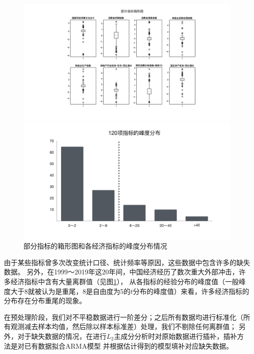 \begin{figure}[H]
    \flushleft
    \begin{minipage}[t]{1\textwidth}
    \includegraphics[width=16cm]{pics/chapter2/box.pdf}
    \end{minipage}
    \begin{minipage}[t]{1\textwidth}
    \centering
    \includegraphics[width=12cm]{pics/chapter2/skew.pdf}
    \end{minipage}
    \caption{\small 部分指标的箱形图和各经济指标的峰度分布情况}
    \label{desc}
\end{figure}

由于某些指标曾多次改变统计口径、统计频率等原因，这些数据中包含许多的缺失数据。
另外，在1999～2019年这20年间，中国经济经历了数次重大外部冲击，许多经济指标中含有大量离群值（见图\ref{desc}），
从各指标的经验分布的峰度值（一般峰度大于8就被认为是重尾，8是自由度为5的$t$分布的峰度值）来看，许多经济指标的分布存在分布重尾的现象。

在预处理阶段，我们对不平稳数据进行一阶差分；之后所有数据均进行标准化（所有观测减去样本均值，然后除以样本标准差）处理，我们不剔除任何离群值；
另外，对于缺失数据的情况，在进行$L_2$主成分分析时对原始数据进行插补，插补方法是对已有数据拟合ARMA模型
并根据估计得到的模型填补对应缺失数据。

